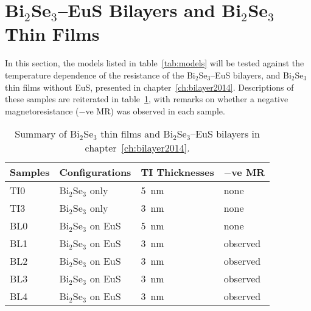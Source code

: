 \FloatBarrier%
\section{Bi$_2$Se$_3$--EuS Bilayers and Bi$_2$Se$_3$ Thin Films}
In this section, the models listed in table~\ref{tab:models} will be tested against the temperature dependence of the resistance of the Bi$_2$Se$_3$--EuS bilayers, and Bi$_2$Se$_3$ thin films without EuS, presented in chapter~\ref{ch:bilayer2014}. Descriptions of these samples are reiterated in table~\ref{tab:models_bl2014}, with remarks on whether a negative magnetoresistance ($-$ve MR) was observed in each sample.%
\begin{table}[ht]
    \centering
    \begin{tabularx}{0.75\columnwidth}[t]{l|l|l|X}
    \caption[Summary of Bi$_2$Se$_3$ thin films and Bi$_2$Se$_3$--EuS bilayers]{\label{tab:models_bl2014}Summary of Bi$_2$Se$_3$ thin films and Bi$_2$Se$_3$--EuS bilayers in chapter~\ref{ch:bilayer2014}.}\\
		\hline\hline
        Samples & Configurations & TI Thicknesses & $-$ve MR\\
        \hline
        TI0 & Bi$_2$Se$_3$ only & 5~nm & none\\
        TI3 & Bi$_2$Se$_3$ only & 3~nm & none\\
        BL0 & Bi$_2$Se$_3$ on EuS & 5~nm & none\\
        BL1 & Bi$_2$Se$_3$ on EuS & 3~nm & observed\\
        BL2 & Bi$_2$Se$_3$ on EuS & 3~nm & observed\\
        BL3 & Bi$_2$Se$_3$ on EuS & 3~nm & observed\\
        BL4 & Bi$_2$Se$_3$ on EuS & 3~nm & observed\\
		\hline\hline
    \end{tabularx}
\end{table}%

